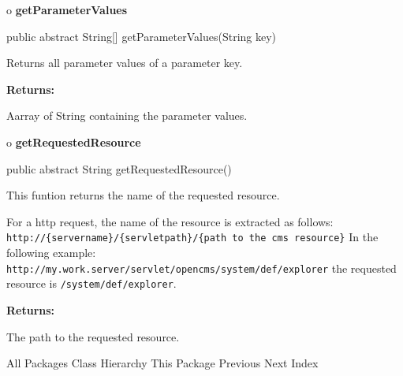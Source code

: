 o {\bf getParameterValues} 

\begin{PRE}
 public abstract String[] getParameterValues(String key)
\end{PRE}

\begin{description}
\htmlDD Returns all parameter values of a parameter key. 

\begin{description}
\item {\bf Returns:}  

Aarray of String containing the parameter values.  
\end{description}

\end{description}

o {\bf getRequestedResource} 

\begin{PRE}
 public abstract String getRequestedResource()
\end{PRE}

\begin{description}
\htmlDD This funtion returns the name of the requested resource. 

For a http request, the name of the resource is extracted as follows: {\tt
http://\{servername\}/\{servletpath\}/\{path to the cms resource\}} In the
following example: {\tt
http://my.work.server/servlet/opencms/system/def/explorer} the requested
resource is {\tt /system/def/explorer}. 

\begin{description}
\item {\bf Returns:}  

The path to the requested resource.  
\end{description}

\end{description}

\htmlHR

\begin{PRE}
All Packages  Class Hierarchy  This Package  Previous  Next  Index
\end{PRE}

